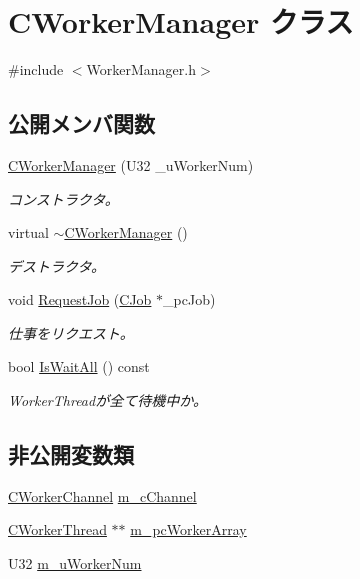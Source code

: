 \hypertarget{class_c_worker_manager}{}\section{C\+Worker\+Manager クラス}
\label{class_c_worker_manager}


{\ttfamily \#include $<$Worker\+Manager.\+h$>$}

\subsection*{公開メンバ関数}
\begin{DoxyCompactItemize}
\item 
\hyperlink{class_c_worker_manager_ae5bb46bc37d767255d303e028a3bda37}{C\+Worker\+Manager} (U32 \+\_\+u\+Worker\+Num)
\begin{DoxyCompactList}\small\item\em コンストラクタ。 \end{DoxyCompactList}\item 
virtual \hyperlink{class_c_worker_manager_aaa563837b4a26d962333d78fabed71b4}{$\sim$\+C\+Worker\+Manager} ()
\begin{DoxyCompactList}\small\item\em デストラクタ。 \end{DoxyCompactList}\item 
void \hyperlink{class_c_worker_manager_ac293a2194345639c8ef9ac82f1c4f6f6}{Request\+Job} (\hyperlink{class_c_job}{C\+Job} $\ast$\+\_\+pc\+Job)
\begin{DoxyCompactList}\small\item\em 仕事をリクエスト。 \end{DoxyCompactList}\item 
bool \hyperlink{class_c_worker_manager_a715722ceb767dd9595f0e361fa387177}{Is\+Wait\+All} () const 
\begin{DoxyCompactList}\small\item\em Worker\+Threadが全て待機中か。 \end{DoxyCompactList}\end{DoxyCompactItemize}
\subsection*{非公開変数類}
\begin{DoxyCompactItemize}
\item 
\hyperlink{class_c_worker_channel}{C\+Worker\+Channel} \hyperlink{class_c_worker_manager_a4884b59ebb53097e998625e108af68c0}{m\+\_\+c\+Channel}
\item 
\hyperlink{class_c_worker_thread}{C\+Worker\+Thread} $\ast$$\ast$ \hyperlink{class_c_worker_manager_ab27095cc8bedef73c7d4d6e6f928da98}{m\+\_\+pc\+Worker\+Array}
\item 
U32 \hyperlink{class_c_worker_manager_a06bca404c8d4d519fd676e9dd7470fe7}{m\+\_\+u\+Worker\+Num}
\end{DoxyCompactItemize}



